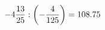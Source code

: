 \documentclass[preview]{standalone}
\begin{document}
\begin{align*}
-4 { 13 \over 25 }  :  \left( - { 4 \over 125 } \right) = 108.75
\end{align*}
\end{document}

